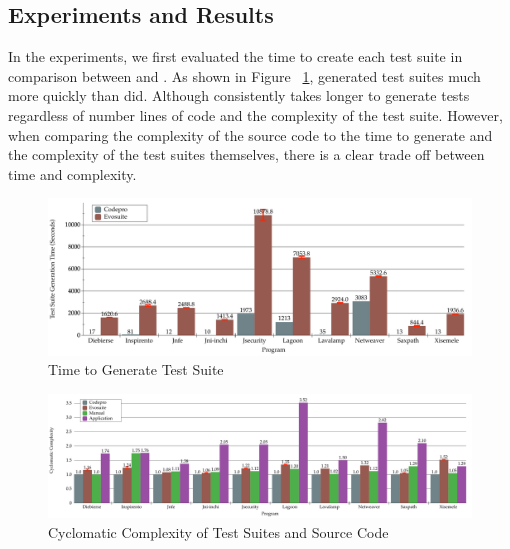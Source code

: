 \subsection{Experiments and Results}

In the experiments, we first evaluated the time to create each test suite in comparison between \evo and \codepro. As shown in Figure ~\ref{fig:Time}, \codepro generated test suites much more quickly than \evo did. Although \evo consistently takes longer to generate tests regardless of number lines of code and the complexity of the test suite. However, when comparing the complexity of the source code to the time to generate and the complexity of the test suites themselves, there is a clear trade off between time and complexity.

\begin{figure}[!t]
\centering
  \includegraphics[width=\linewidth]{Time}
    \caption{Time to Generate Test Suite}
  \label{fig:Time}
\end{figure}

\begin{figure}[!t]
\centering
  \includegraphics[width=\linewidth]{Complexity}
   \caption{Cyclomatic Complexity of Test Suites and Source Code}
  \label{fig:Complexity}
\end{figure}

